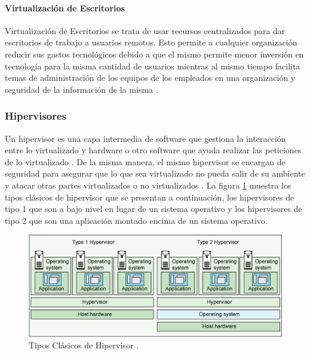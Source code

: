 \paragraph{Virtualización de Escritorios}
Virtualización de Escritorios se trata de usar recursos centralizados para dar escritorios de trabajo a usuarios remotos. Esto permite a cualquier organización reducir sus gastos tecnológicos debido a que el mismo permite menor inversión en tecnología para la misma cantidad de usuarios mientras al mismo tiempo facilita temas de administración de los equipos de los empleados en una organización y seguridad de la información de la misma \citep{VMWare-Virtualization}.

\subsubsection{Hipervisores}
Un hipervisor es una capa intermedia de software que gestiona la interacción entre lo virtualizado y hardware o otro software que ayuda realizar las peticiones de lo virtualizado \citep{VMWare-Virtualization}. De la misma manera, el mismo hipervisor se encargan de seguridad para asegurar que lo que sea virtualizado no pueda salir de su ambiente y atacar otras partes virtualizados o no virtualizados \citep{VMWare-HypervisorSecurity} \citep{IBM-KVM-Security}. La figura \ref{IBM-HypervisorTypes} muestra los tipos clásicos de hipervisor que se presentan a continuación, los hipervisores de tipo 1 que son a bajo nivel en lugar de un sistema operativo y los hipervisores de tipo 2 que son una aplicación montado encima de un sistema operativo.

\begin{figure}
  \begin{center}
      \includegraphics[width=\textwidth]{Figures/ibm-hypervisortypes.png}
  \end{center}
  \caption{Tipos Clásicos de Hipervisor \citep{IBM-Hypervisors}.}
  \label{IBM-HypervisorTypes}
\end{figure}

